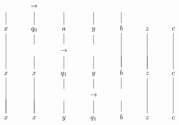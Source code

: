 \documentclass[../main.tex]{subfiles}
\begin{document}
\[\begin{tikzcd}
    |[alias=I1]| \arrow[no head, shorten <=2pt]{d}{} & |[alias=I2]| \rightarrow  \arrow[no head, shorten <=2pt]{d}{} & |[alias=I3]|  \arrow[no head, shorten <=2pt]{d}{} &  \arrow[no head, shorten <=2pt]{d}{} & \arrow[no head, shorten <=2pt]{d}{} & \ & \ \\
    x \arrow[no head]{dd}{} & q_0 \arrow[no head, shorten >=7pt]{d}{} & a \arrow[no head, shorten >=4pt]{d}{} & y \arrow[no head, shorten >=7pt]{d}{} & b \arrow[no head]{dd}{} & z \arrow[no head]{dd}{} & c \arrow[no head]{dd}{} \\
    & |[alias=J1]| \arrow[no head, shorten <=2pt]{d}{} & |[alias=J2]| \rightarrow  \arrow[no head, shorten <=2pt]{d}{} & |[alias=J3]| \ \arrow[no head, shorten <=2pt]{d}{} &  \arrow[no head, shorten <=2pt]{d}{} & \arrow[no head, shorten <=2pt]{d}{} & \ & \ \\
    x \arrow[no head]{dd}{} & x \arrow[no head]{dd}{} & q_1 \arrow[no head, shorten >=7pt]{d}{} & y \arrow[no head, shorten >=4pt]{d}{} & b \arrow[no head, shorten >=7pt]{d}{} & z \arrow[no head]{dd}{} & c \arrow[no head]{dd}{} \\
    \ \arrow[no head]{d}{} & \ \arrow[no head, shorten <=2pt]{d}{} & |[alias=K1]| \arrow[no head, shorten <=2pt]{d}{} & |[alias=K2]| \rightarrow  \arrow[no head, shorten <=2pt]{d}{} & |[alias=K3]|  \arrow[no head, shorten <=2pt]{d}{} & \ & \ \\
    x & x & y & q_1 & b & z & c
\end{tikzcd}
\]

\newpage
\end{document}
